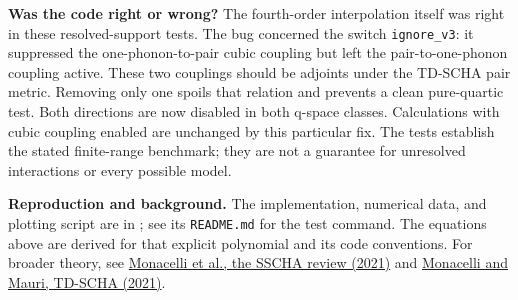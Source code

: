 \documentclass[11pt,a4paper]{article}
\begin{document}
\textbf{Was the code right or wrong?} The fourth-order interpolation itself was
right in these resolved-support tests. The bug concerned the switch
\texttt{ignore\_v3}: it suppressed the one-phonon-to-pair cubic coupling but
left the pair-to-one-phonon coupling active. These two couplings should be
adjoints under the TD-SCHA pair metric. Removing only one spoils that relation
and prevents a clean pure-quartic test. Both directions are now disabled in
both q-space classes. Calculations with cubic coupling enabled are unchanged
by this particular fix. The tests establish the stated finite-range benchmark;
they are not a guarantee for unresolved interactions or every possible model.

\small
\textbf{Reproduction and background.} The implementation, numerical data, and
plotting script are in ; see its
\texttt{README.md} for the test command. The equations above are derived for
that explicit polynomial and its code conventions. For broader theory, see
\href{https://arxiv.org/abs/2103.03973}{Monacelli et al., the SSCHA review (2021)}
and \href{https://arxiv.org/abs/2011.14986}{Monacelli and Mauri, TD-SCHA (2021)}.
\end{document}

